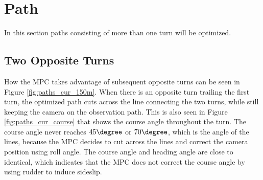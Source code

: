 \section{Path}

In this section paths consisting of more than one turn will be optimized.


\subsection{Two Opposite Turns}

How the MPC takes advantage of subsequent opposite turns can be seen in Figure \ref{fig:paths_cur_150m}. When there is an opposite turn trailing the first turn, the optimized path cuts across the line connecting the two turns, while still keeping the camera on the observation path. This is also seen in Figure \ref{fig:paths_cur_course} that shows the course angle throughout the turn. The course angle never reaches $45\degree$ or $70\degree$, which is the angle of the lines, because the MPC decides to cut across the lines and correct the camera position using roll angle. The course angle and heading angle are close to identical, which indicates that the MPC does not correct the course angle by using rudder to induce sideslip.

